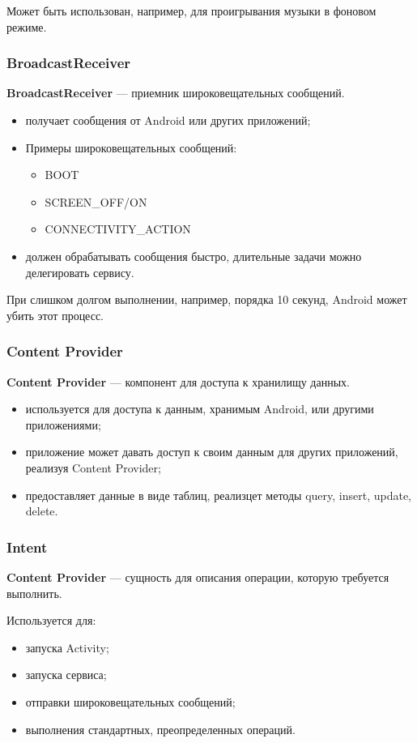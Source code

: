 Может быть использован, например, для проигрывания музыки в фоновом режиме.


\subsubsection{BroadcastReceiver}
\textbf{BroadcastReceiver} --- приемник широковещательных сообщений.

\begin{itemize}
	\item получает сообщения от Android или других приложений;
	\item Примеры широковещательных сообщений:
	\begin{itemize}
		\item BOOT
		\item SCREEN\_OFF/ON
		\item CONNECTIVITY\_ACTION
	\end{itemize}
	\item должен обрабатывать сообщения быстро, длительные задачи можно делегировать сервису.
\end{itemize}

При слишком долгом выполнении, например, порядка 10 секунд, Android может убить этот процесс.


\subsubsection{Content Provider}
\textbf{Content Provider} --- компонент для доступа к хранилищу данных.

\begin{itemize}
	\item используется для доступа к данным, хранимым Android, или другими приложениями;
	\item приложение может давать доступ к своим данным для других приложений, реализуя Content Provider;
	\item предоставляет данные в виде таблиц, реализцет методы query, insert, update, delete.
\end{itemize}


\subsubsection{Intent}
\textbf{Content Provider} --- сущность для описания операции, которую требуется выполнить.

Используется для:
\begin{itemize}
	\item запуска Activity;
	\item запуска сервиса;
	\item отправки широковещательных сообщений;
	\item выполнения стандартных, преопределенных операций.
\end{itemize}


